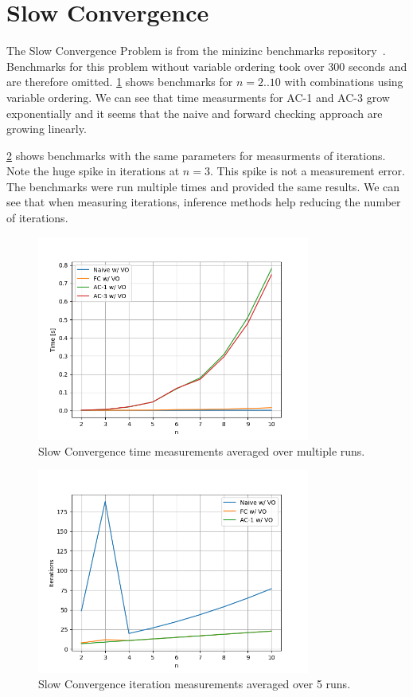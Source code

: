 \section{Slow Convergence}

The Slow Convergence Problem is from the minizinc benchmarks repository~\cite{minizinc_slow:2018}. Benchmarks for this problem without variable ordering took over 300 seconds and are therefore omitted. \cref{fig:slow:time-small} shows benchmarks for $n=2..10$ with combinations using variable ordering. We can see that time measurments for AC-1 and AC-3 grow exponentially and it seems that the naive and forward checking approach are growing linearly.

\cref{fig:slow:iterations-small} shows benchmarks with the same parameters for measurments of iterations. Note the huge spike in iterations at $n = 3$. This spike is not a measurement error. The benchmarks were run multiple times and provided the same results. We can see that when measuring iterations, inference methods help reducing the number of iterations.

\begin{figure}[ht]
	\centering
	\includegraphics[width=0.8\textwidth]{./Problems/slow_convergence/plots/time_small.png}
	\caption{Slow Convergence time measurements averaged over multiple runs.}
	\label{fig:slow:time-small}
\end{figure}

\begin{figure}[ht]
	\centering
	\includegraphics[width=0.8\textwidth]{./Problems/slow_convergence/plots/iterations_small.png}
	\caption{Slow Convergence iteration measurements averaged over 5 runs.}
	\label{fig:slow:iterations-small}
\end{figure}

